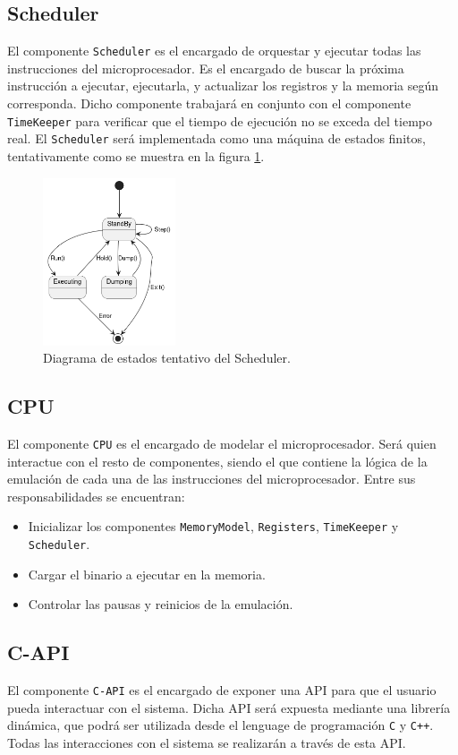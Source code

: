 \documentclass[
  11pt, %
  codirector, %
]{charter}
\begin{document}
\subsection{Scheduler}

El componente \texttt{Scheduler} es el encargado de orquestar y ejecutar todas las instrucciones del microprocesador. Es el encargado de buscar la próxima instrucción a ejecutar, ejecutarla, y actualizar los registros y la memoria según corresponda. Dicho componente trabajará en conjunto con el componente \texttt{TimeKeeper} para verificar que el tiempo de ejecución no se exceda del tiempo real. El \texttt{Scheduler} será implementada como una máquina de estados finitos, tentativamente como se muestra en la figura \ref{fig:Scheduler}.

\begin{figure}[htpb]
  \centering
  \includegraphics[width=0.35\textwidth]{./Figuras/States.png}
  \caption{Diagrama de estados tentativo del Scheduler.}
  \label{fig:Scheduler}
\end{figure}

\vspace{25px}


\subsection{CPU}

El componente \texttt{CPU} es el encargado de modelar el microprocesador. Será quien interactue con el resto de componentes, siendo el que contiene la lógica de la emulación de cada una de las instrucciones del microprocesador. Entre sus responsabilidades se encuentran:

\begin{itemize}
\item Inicializar los componentes \texttt{MemoryModel}, \texttt{Registers}, \texttt{TimeKeeper} y \texttt{Scheduler}.
\item Cargar el binario a ejecutar en la memoria.
\item Controlar las pausas y reinicios de la emulación.
\end{itemize}


\subsection{C-API}

El componente \texttt{C-API} es el encargado de exponer una API para que el usuario pueda interactuar con el sistema. Dicha API será expuesta mediante una librería dinámica, que podrá ser utilizada desde el lenguage de programación \texttt{C} y \texttt{C++}. Todas las interacciones con el sistema se realizarán a través de esta API.
\end{document}

